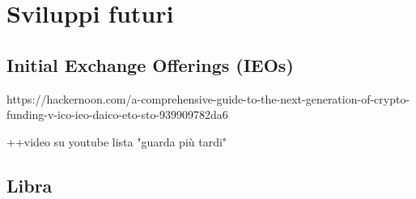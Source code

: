 \chapter{Sviluppi futuri}
\section{Initial Exchange Offerings (IEOs)}
https://hackernoon.com/a-comprehensive-guide-to-the-next-generation-of-crypto-funding-v-ico-ieo-daico-eto-sto-939909782da6

++video su youtube lista "guarda più tardi"
\section{Libra}